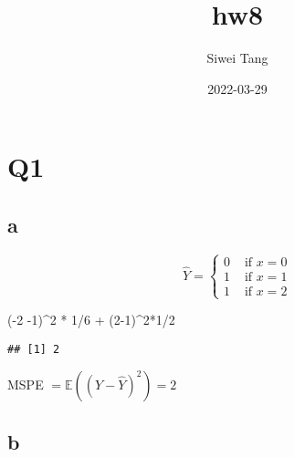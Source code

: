 \documentclass[
]{article}
\title{hw8}
\author{Siwei Tang}
\date{2022-03-29}
\newenvironment{Shaded}{\begin{snugshade}}{\end{snugshade}}
\newcommand{\DecValTok}[1]{\textcolor[rgb]{0.00,0.00,0.81}{#1}}
\newcommand{\NormalTok}[1]{#1}
\newcommand{\SpecialCharTok}[1]{\textcolor[rgb]{0.00,0.00,0.00}{#1}}
\begin{document}
\maketitle

\hypertarget{q1}{%
\section{Q1}\label{q1}}

\hypertarget{a}{%
\subsection{a}\label{a}}

\[\hat{Y}=\begin{cases}
0 & \text{ if } x= 0\\
1 & \text{ if } x= 1\\
1 & \text{ if } x= 2
\end{cases}\]

\begin{Shaded}
\begin{Highlighting}[]
\NormalTok{(}\SpecialCharTok{{-}}\DecValTok{2} \SpecialCharTok{{-}}\DecValTok{1}\NormalTok{)}\SpecialCharTok{\^{}}\DecValTok{2} \SpecialCharTok{*} \DecValTok{1}\SpecialCharTok{/}\DecValTok{6} \SpecialCharTok{+}\NormalTok{ (}\DecValTok{2{-}1}\NormalTok{)}\SpecialCharTok{\^{}}\DecValTok{2}\SpecialCharTok{*}\DecValTok{1}\SpecialCharTok{/}\DecValTok{2}
\end{Highlighting}
\end{Shaded}

\begin{verbatim}
## [1] 2
\end{verbatim}

MSPE \(=\mathbb{E}((Y-\hat{Y})^2) = 2\)

\hypertarget{b}{%
\subsection{b}\label{b}}
\end{document}
